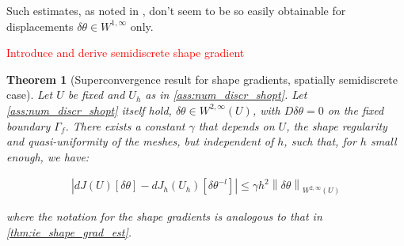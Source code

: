 \documentclass[english,a4paper,9pt,oneside]{scrbook}	%
\theoremstyle{break}
\newtheorem{thm}[equation]{Theorem}
\theoremstyle{remark}
\newcommand{\norm}[1]{\left\lVert#1\right\rVert}
\newcommand{\te}{\theta}
\begin{document}
Such estimates, as noted in \cite{paganini}, don't seem to be so easily obtainable for displacements $\delta \te \in W^{1,\infty}$ only.

\textcolor{red}{Introduce and derive semidiscrete shape gradient}

\begin{thm}[Superconvergence result for shape gradients, spatially semidiscrete case]
\label{thm:superconvergence_sd}
Let $U$ be fixed and $U_h$ as in \cref{ass:num_discr_shopt}. Let \cref{ass:num_discr_shopt} itself hold, $\delta \te \in W^{2,\infty}(U)$, with $D\delta \te=0$ on the fixed boundary $\Gamma_f$. There exists a constant $\gamma$ that depends on $U$, the shape regularity and quasi-uniformity of the meshes, but independent of $h$, such that, for $h$ small enough, we have:

\begin{align*}
	\left |dJ(U)[\delta \te] - dJ_h(U_h)[\delta \te^{-l}] \right|\leq \gamma  h^2 \norm{\delta \te}_{W^{2,\infty}(U)}
\end{align*}

where the notation for the shape gradients is analogous to that in \cref{thm:ie_shape_grad_est}.

\end{thm}
\end{document}
